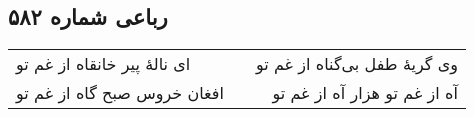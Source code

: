 \begin{center}
\section*{رباعی شماره ۵۸۲}
\label{sec:sh582}
\begin{longtable}{l p{0.5cm} r}
ای نالهٔ پیر خانقاه از غم تو
&&
وی گریهٔ طفل بی‌گناه از غم تو
\\
افغان خروس صبح گاه از غم تو
&&
آه از غم تو هزار آه از غم تو
\\
\end{longtable}
\end{center}

